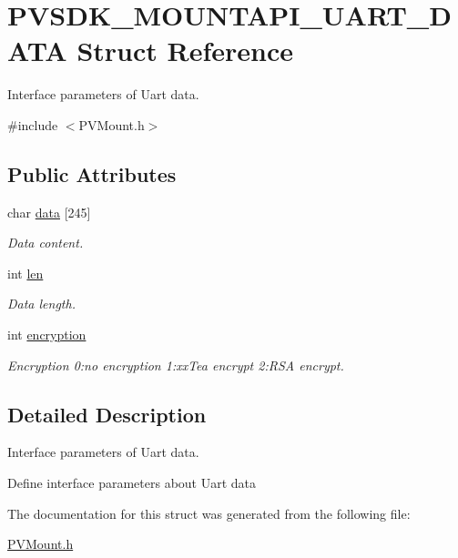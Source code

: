 \hypertarget{struct_p_v_s_d_k___m_o_u_n_t_a_p_i___u_a_r_t___d_a_t_a}{}\section{P\+V\+S\+D\+K\+\_\+\+M\+O\+U\+N\+T\+A\+P\+I\+\_\+\+U\+A\+R\+T\+\_\+\+D\+A\+TA Struct Reference}
\label{struct_p_v_s_d_k___m_o_u_n_t_a_p_i___u_a_r_t___d_a_t_a}


Interface parameters of Uart data.  




{\ttfamily \#include $<$P\+V\+Mount.\+h$>$}

\subsection*{Public Attributes}
\begin{DoxyCompactItemize}
\item 
\mbox{\label{struct_p_v_s_d_k___m_o_u_n_t_a_p_i___u_a_r_t___d_a_t_a_a4a1d8fa3b43a0821976b89fb31e14fe4}} 
char \hyperlink{struct_p_v_s_d_k___m_o_u_n_t_a_p_i___u_a_r_t___d_a_t_a_a4a1d8fa3b43a0821976b89fb31e14fe4}{data} \mbox{[}245\mbox{]}
\begin{DoxyCompactList}\small\item\em Data content. \end{DoxyCompactList}\item 
\mbox{\label{struct_p_v_s_d_k___m_o_u_n_t_a_p_i___u_a_r_t___d_a_t_a_a5b6b55be53d9320470fa93475c8f23ab}} 
int \hyperlink{struct_p_v_s_d_k___m_o_u_n_t_a_p_i___u_a_r_t___d_a_t_a_a5b6b55be53d9320470fa93475c8f23ab}{len}
\begin{DoxyCompactList}\small\item\em Data length. \end{DoxyCompactList}\item 
\mbox{\label{struct_p_v_s_d_k___m_o_u_n_t_a_p_i___u_a_r_t___d_a_t_a_a2720a12b8fdf29c8cb9b667c9615e42c}} 
int \hyperlink{struct_p_v_s_d_k___m_o_u_n_t_a_p_i___u_a_r_t___d_a_t_a_a2720a12b8fdf29c8cb9b667c9615e42c}{encryption}
\begin{DoxyCompactList}\small\item\em Encryption 0\+:no encryption 1\+:xx\+Tea encrypt 2\+:R\+SA encrypt. \end{DoxyCompactList}\end{DoxyCompactItemize}


\subsection{Detailed Description}
Interface parameters of Uart data. 

Define interface parameters about Uart data 

The documentation for this struct was generated from the following file\+:\begin{DoxyCompactItemize}
\item 
\hyperlink{_p_v_mount_8h}{P\+V\+Mount.\+h}\end{DoxyCompactItemize}
